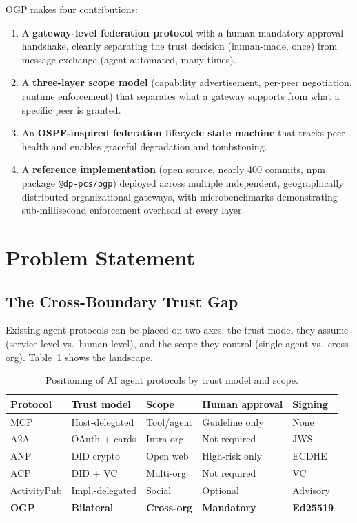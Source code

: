 \documentclass[sigconf,nonacm]{acmart}
\begin{document}
OGP makes four contributions:
\begin{enumerate}
\item A \textbf{gateway-level federation protocol} with a human-mandatory
  approval handshake, cleanly separating the trust decision (human-made,
  once) from message exchange (agent-automated, many times).
\item A \textbf{three-layer scope model} (capability advertisement,
  per-peer negotiation, runtime enforcement) that separates what a gateway
  supports from what a specific peer is granted.
\item An \textbf{OSPF-inspired federation lifecycle state machine} that
  tracks peer health and enables graceful degradation and tombstoning.
\item A \textbf{reference implementation} (open source, nearly 400 commits,
  npm package \texttt{@dp-pcs/ogp}) deployed across multiple independent,
  geographically distributed organizational gateways, with microbenchmarks
  demonstrating sub-millisecond enforcement overhead at every layer.
\end{enumerate}

\section{Problem Statement}

\subsection{The Cross-Boundary Trust Gap}

Existing agent protocols can be placed on two axes: the trust model
they assume (service-level vs.\ human-level), and the scope they control
(single-agent vs.\ cross-org). Table~\ref{tab:protocols} shows the landscape.

\begin{table}[h]
\centering
\caption{Positioning of AI agent protocols by trust model and scope.}
\label{tab:protocols}
\small
\begin{tabular}{lllll}
\toprule
Protocol & Trust model & Scope & Human approval & Signing \\
\midrule
MCP      & Host-delegated & Tool/agent & Guideline only & None \\
A2A      & OAuth + cards  & Intra-org  & Not required   & JWS \\
ANP      & DID crypto     & Open web   & High-risk only & ECDHE \\
ACP      & DID + VC       & Multi-org  & Not required   & VC \\
ActivityPub & Impl.-delegated & Social & Optional & Advisory \\
\textbf{OGP} & \textbf{Bilateral} & \textbf{Cross-org} & \textbf{Mandatory} & \textbf{Ed25519} \\
\bottomrule
\end{tabular}
\end{table}
\end{document}
